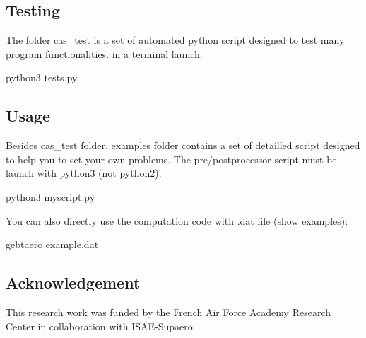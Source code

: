 \subsection*{Testing}

The folder cas\+\_\+test is a set of automated python script designed to test many program functionalities. in a terminal launch\+: 
\begin{DoxyCode}
python3 tests.py
\end{DoxyCode}


\subsection*{Usage}

Besides cas\+\_\+test folder, examples folder contains a set of detailled script designed to help you to set your own problems. The pre/postprocessor script must be launch with python3 (not python2). 
\begin{DoxyCode}
python3 myscript.py
\end{DoxyCode}
 You can also directly use the computation code with .dat file (show examples)\+: 
\begin{DoxyCode}
gebtaero example.dat
\end{DoxyCode}


\subsection*{Acknowledgement}

This research work was funded by the French Air Force Academy Research Center in collaboration with I\+S\+A\+E-\/\+Supaero 